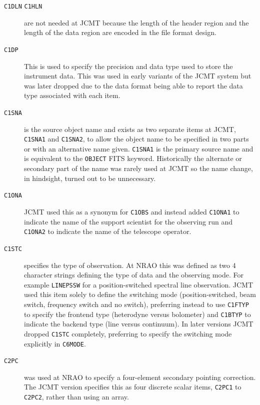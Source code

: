 \documentclass[final,authoryear,5p,times,twocolumn]{elsarticle}
\begin{document}
\begin{description}

\item[\texttt{C1DLN} \texttt{C1HLN}] are not needed at JCMT
  because the length of the header region and the length of the data
  region are encoded in the file format design.

\item[\texttt{C1DP}] This is used to specify the precision and data
  type used to store the instrument data. This was used in early
  variants of the JCMT system but was later dropped due to the data
  format being able to report the data type associated with each item.

\item[\texttt{C1SNA}] is the source object name and exists as two separate
  items at JCMT, \texttt{C1SNA1} and \texttt{C1SNA2}, to allow the
  object name to be specified in two parts or with an alternative name
  given. \texttt{C1SNA1} is the primary source name and is equivalent
  to the \texttt{OBJECT} FITS keyword. Historically the alternate or
  secondary part of the name was rarely used at JCMT so the name
  change, in hindsight, turned out to be unnecessary.

\item[\texttt{C1ONA}] JCMT used this as a synonym for \texttt{C1OBS}
  and instead added \texttt{C1ONA1} to indicate the name of the
  support scientist for the observing run and \texttt{C1ONA2} to
  indicate the name of the telescope operator.

\item[\texttt{C1STC}] specifies the type of observation. At NRAO this
  was defined as two 4 character strings defining the type of data and
  the observing mode. For example \texttt{LINEPSSW} for a
  position-switched spectral line observation. JCMT used this item
  solely to define the switching mode (position-switched, beam switch,
  frequency switch and no switch), preferring instead to use
  \texttt{C1FTYP} to specify the frontend type (heterodyne versus
  bolometer) and \texttt{C1BTYP} to indicate the backend type (line
  versus continuum). In
  later versions JCMT dropped \texttt{C1STC} completely, preferring to
  specify the switching mode explicitly in \texttt{C6MODE}.

\item[\texttt{C2PC}] was used at NRAO to specify a four-element
  secondary pointing correction. The JCMT version specifies this as
  four discrete scalar items, \texttt{C2PC1} to \texttt{C2PC2}, rather
  than using an array.


\end{description}
\end{document}

